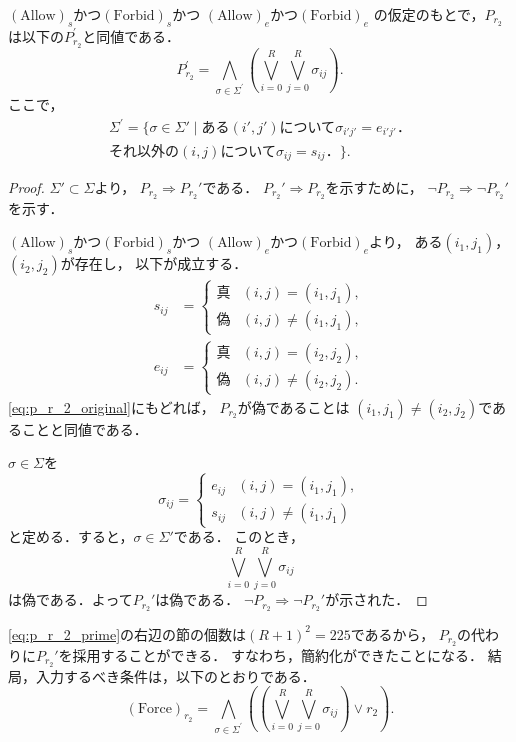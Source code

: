 \begin{lem}
 $(\text{Allow})_s$かつ$(\text{Forbid})_s$かつ
 $(\text{Allow})_e$かつ$(\text{Forbid})_e$
 の仮定のもとで，$P_{r_2}$は以下の$P_{r_2}^{\prime}$と同値である．
 \begin{equation}
  P_{r_2}^{\prime} = \bigwedge_{\sigma \in \Sigma^{\prime}}
   \left( 
    \bigvee_{i=0}^R \bigvee_{j=0}^R \sigma_{ij} \right).
  \label{eq:p_r_2_prime}
 \end{equation}
 ここで，
 \begin{multline*}
  \Sigma^{\prime}
 = \{ \sigma \in \Sigma'
 \mid \text{ある$(i', j')$について$\sigma_{i'j'} = e_{i'j'}$．} \\
  \text{
 それ以外の$(i, j)$について$\sigma_{ij} = s_{ij}$．} \}.
 \end{multline*}
\end{lem}

\begin{proof}
 $\Sigma' \subset \Sigma$より，
 $P_{r_2} \Rightarrow P_{r_2}'$である．
 $P_{r_2}' \Rightarrow P_{r_2}$を示すために，
 $\lnot P_{r_2} \Rightarrow \lnot P_{r_2}'$を示す．
 
 $(\text{Allow})_s$かつ$(\text{Forbid})_s$かつ
 $(\text{Allow})_e$かつ$(\text{Forbid})_e$より，
 ある$(i_1, j_1)$，$(i_2, j_2)$が存在し，
 以下が成立する．
 \begin{align*}
  s_{ij} &=
  \begin{cases}
   \text{真} & (i, j) = (i_1, j_1), \\
   \text{偽} & (i, j) \neq (i_1, j_1),
  \end{cases} \\
  e_{ij} &=
  \begin{cases}
   \text{真} & (i, j) = (i_2, j_2), \\
   \text{偽} & (i, j) \neq (i_2, j_2).
  \end{cases}
 \end{align*}
 \eqref{eq:p_r_2_original}にもどれば，
 $P_{r_2}$が偽であることは
 $(i_1, j_1) \neq (i_2, j_2)$であることと同値である．
 
 $\sigma \in \Sigma$を
 \[
 \sigma_{ij} =
 \begin{cases}
  e_{ij} & (i, j) = (i_1, j_1), \\
  s_{ij} & (i, j) \neq (i_1, j_1)
 \end{cases}
 \]
 と定める．すると，$\sigma \in \Sigma'$である．
 このとき，
 \[
  \bigvee_{i = 0}^R
  \bigvee_{j = 0}^R \sigma_{ij}
 \]
 は偽である．よって$P_{r_2}'$は偽である．
 $\lnot P_{r_2} \Rightarrow \lnot P_{r_2}'$が示された．\qedhere
\end{proof}

\eqref{eq:p_r_2_prime}の右辺の節の個数は$(R+1)^2 = 225$であるから，
$P_{r_2}$の代わりに$P_{r_2}'$を採用することができる．
すなわち，簡約化ができたことになる．
結局，入力するべき条件は，以下のとおりである．
\[
(\text{Force})_{r_2} = \bigwedge_{\sigma \in \Sigma^{\prime}}
   \left( 
   \left( 
    \bigvee_{i=0}^R \bigvee_{j=0}^R \sigma_{ij} \right)
    \lor r_2 \right).
\]



